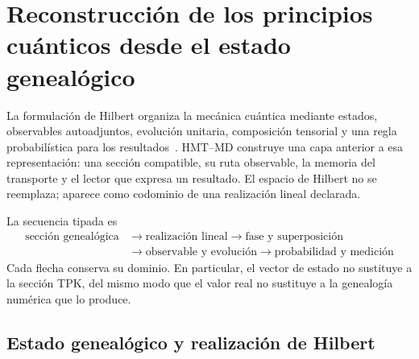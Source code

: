 \section{Reconstrucción de los principios cuánticos desde el estado genealógico}
\label{v:rec:sec:postulados-cuanticos-genealogicos-rev2}

La formulación de Hilbert organiza la mecánica cuántica mediante estados,
observables autoadjuntos, evolución unitaria, composición tensorial y una
regla probabilística para los resultados~\cite{vonNeumann1932}. HMT--MD
construye una capa anterior a esa representación: una sección compatible,
su ruta observable, la memoria del transporte y el lector que expresa un
resultado. El espacio de Hilbert no se reemplaza; aparece como codominio de
una realización lineal declarada.

La secuencia tipada es
\[
 \boxed{\begin{aligned}
 \text{sección genealógica}
 &\longrightarrow \text{realización lineal}
 \longrightarrow \text{fase y superposición}\\
 &\longrightarrow \text{observable y evolución}
 \longrightarrow \text{probabilidad y medición}
 \end{aligned}}
\]
Cada flecha conserva su dominio. En particular, el vector de estado no
sustituye a la sección TPK, del mismo modo que el valor real no sustituye a
la genealogía numérica que lo produce.

\subsection{Estado genealógico y realización de Hilbert}
\label{v:rec:realizacion_evolucion:section:02}

